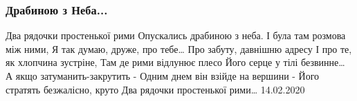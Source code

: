  
 
 

\subsubsection{Драбиною з Неба...}

Два рядочки простенької рими
Опускались драбиною з неба.
І була там розмова між ними,
Я так думаю, друже, про тебе…
Про забуту, давнішню адресу
І про те, як хлопчина зустріне,
Там де рими відлунює плесо
Його серце у тілі безвинне…
А якщо затуманить-закрутить -
Одним днем він взійде на вершини -
Його стратять безжалісно, круто
Два рядочки простенької рими…
14.02.2020 
